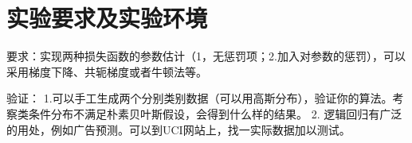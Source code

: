 \section{实验要求及实验环境}

要求：实现两种损失函数的参数估计（1，无惩罚项；2.加入对参数的惩罚），可以采用梯度下降、共轭梯度或者牛顿法等。

验证：
1.可以手工生成两个分别类别数据（可以用高斯分布），验证你的算法。考察类条件分布不满足朴素贝叶斯假设，会得到什么样的结果。
2. 逻辑回归有广泛的用处，例如广告预测。可以到UCI网站上，找一实际数据加以测试。
